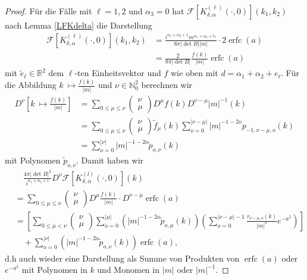 \documentclass[12pt,a4paper]{scrartcl}
\numberwithin{equation}{section}
\newcommand{\R}{\mathbb{R}} %
\newcommand{\N}{\mathbb{N}} %
\newcommand{\F}{\mathcal{F}} %
\newcommand{\erfc}{\operatorname{erfc}}
\begin{document}
\begin{proof}
Für die Fälle mit $\ell=1,2$ und $\alpha_3=0$ hat $\F [K_{\delta,\alpha}^{(\ell)}(\cdot,0)](k_1,k_2)$ nach Lemma \ref{LFKdelta} die Darstellung
\begin{align*}
\F [K_{\delta,\alpha}^{(\ell)}(\cdot,0)](k_1,k_2)
&=\frac{i^{\alpha_1+\alpha_2+1} m^{\alpha_1+\alpha_2+ \tilde e_\ell}}{8 \pi|\det B| |m|} \cdot
2 \erfc(a) \\
&=\frac{2}{8\pi|\det B|}\frac{f(k)}{|m|}\erfc(a)
\end{align*} 
mit $\tilde e_\ell \in \R^2$ dem $\ell$-ten Einheitsvektor und $f$ wie oben mit $d=\alpha_1+\alpha_2+e_\ell$. Für die Abbildung $k\ \mapsto \frac{f(k)}{|m|}$ und $\nu \in \N_0^2$ berechnen wir 
\begin{align*}
D^\nu \left[ k\ \mapsto \frac{f(k)}{|m|} \right] 
&= \sum_{0 \leq \mu \leq \nu} \begin{pmatrix}
\nu \\ \mu 
\end{pmatrix} D^\mu f(k) D^{\nu-\mu} |m|^{-1}(k) \\
&= \sum_{0 \leq \mu \leq \nu} \begin{pmatrix}
\nu \\ \mu 
\end{pmatrix} \tilde f_\mu(k) \sum_{o=0}^{|\nu-\mu|}|m|^{-1-2o}p_{-1,\nu-\mu,o}(k) \\
&= \sum_{o=0}^{|\nu|} |m|^{-1-2o} \tilde p_{o,\nu}(k)
\end{align*}
mit Polynomen $\tilde p_{o,\nu}$. Damit haben wir
\begin{align*}
& \quad \frac{4\pi |\det B|^2 }{i^{\alpha_1+\alpha_2+1}}D^\nu \F[ K_{\delta,\alpha}^{(l)}(\cdot,0)](k) \\
&= \sum_{0 \leq \mu \leq \nu} \begin{pmatrix}
\nu \\ \mu
\end{pmatrix} D^\mu \frac{f(k)}{|m|} \cdot D^{\nu-\mu}\erfc(a) \\
&= \left[\sum_{0 \leq \mu < \nu} \begin{pmatrix}
\nu \\ \mu
\end{pmatrix} \sum_{o=0}^{|\mu|}\left( |m|^{-1-2o}  \tilde p_{o,\mu}(k) \right) \left( \sum_{o=0}^{|\nu-\mu|-1} \frac{r_{\nu-\mu,o}(k)}{|m|^o} e^{-a^2}\right)\right] \\
& \quad + \sum_{o=0}^{|\nu|}\left( |m|^{-1-2o}  \tilde p_{o,\nu}(k) \right) \erfc(a),
\end{align*}
d.h auch wieder eine Darstellung als Summe von Produkten von $\erfc(a)$ oder $e^{-a^2}$ mit Polynomen in $k$ und Monomen in $|m|$ oder $|m|^{-1}$.
 

\end{proof}
\end{document}
